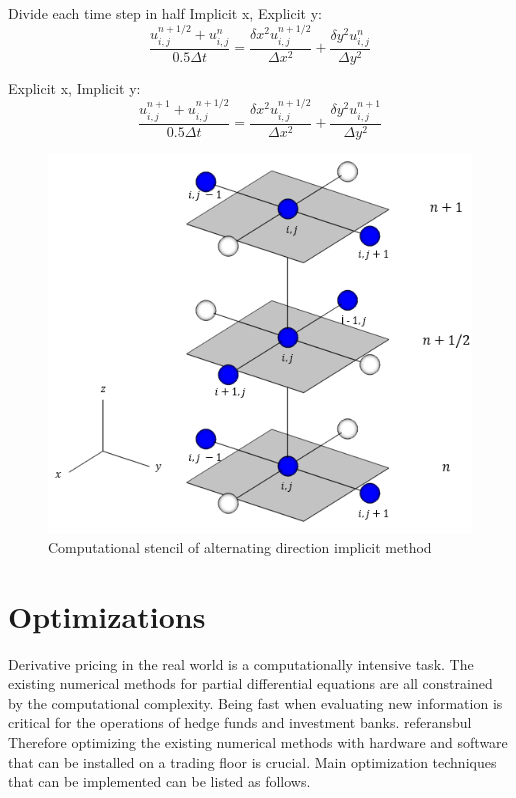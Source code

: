 \documentclass[12pt, oneside]{book}
\theoremstyle{plain}
\theoremstyle{definition}
\begin{document}
Divide each time step in half
Implicit x, Explicit y:
\begin{equation}
\frac{u^{n+1/2}_{i,j} + u^{n}_{i,j}}{0.5 \Delta t} = \frac{\delta x^2 u^{n+1/2}_{i,j} }{\Delta x^2} + \frac{\delta y^2 u^{n}_{i,j}}{\Delta y^2}
\end{equation}

Explicit x, Implicit y:
\begin{equation}
\frac{u^{n+1}_{i,j} + u^{n+1/2}_{i,j}}{0.5 \Delta t} = \frac{\delta x^2 u^{n+1/2}_{i,j} }{\Delta x^2} + \frac{\delta y^2 u^{n+1}_{i,j}}{\Delta y^2}
\end{equation}


    \begin{figure}[!htb]
        \centering
            \includegraphics[scale=0.8]{ADI.png}
        \caption{Computational stencil of alternating direction implicit method}
    \end{figure}



\section{Optimizations}
Derivative pricing in the real world is a computationally intensive task. The existing numerical methods for partial differential equations are all constrained by the computational complexity. Being fast when evaluating new information is critical for the operations of hedge funds and investment banks. referansbul Therefore optimizing the existing numerical methods with hardware and software that can be installed on a trading floor is crucial. Main optimization techniques that can be implemented can be listed as follows.
\end{document}
